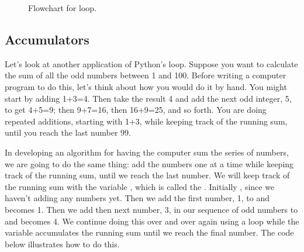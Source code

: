 \documentclass[letterpaper,10pt,english]{sphinxmanual}
\begin{document}
\begin{figure}[htbp]
\centering
\capstart

\noindent{}
\caption{Flowchart for \sphinxhyphen{}loop.}\label{\detokenize{chap6/chap6_loopsconds:id4}}\label{\detokenize{chap6/chap6_loopsconds:fig-flow-for}}\end{figure}


\subsection{Accumulators}
\label{\detokenize{chap6/chap6_loopsconds:accumulators}}
\sphinxAtStartPar
Let’s look at another application of Python’s  loop.  Suppose you want to calculate the sum of all the odd numbers between 1 and 100.  Before writing a computer program to do this, let’s think about how you would do it by hand.  You might start by adding 1+3=4.  Then take the result 4 and add the next odd integer, 5, to get 4+5=9; then 9+7=16, then 16+9=25, and so forth.  You are doing repeated additions, starting with 1+3, while keeping track of the running sum, until you reach the last number 99.

\sphinxAtStartPar
In developing an algorithm for having the computer sum the series of numbers, we are going to do the same thing: add the numbers one at a time while keeping track of the running sum, until we reach the last number.  We will keep track of the running sum with the variable , which is called the .  Initially , since we haven’t adding any numbers yet.  Then we add the first number, 1, to  and  becomes 1.  Then we add then next number, 3, in our sequence of odd numbers to  and  becomes 4.  We continue doing this over and over again using a  loop while the variable  accumulates the running sum until we reach the final number.  The code below illustrates how to do this.

\begin{sphinxVerbatim}[commandchars=\\\{\},numbers=left,firstnumber=1,stepnumber=1]
  
     
      
\end{sphinxVerbatim}
\end{document}
